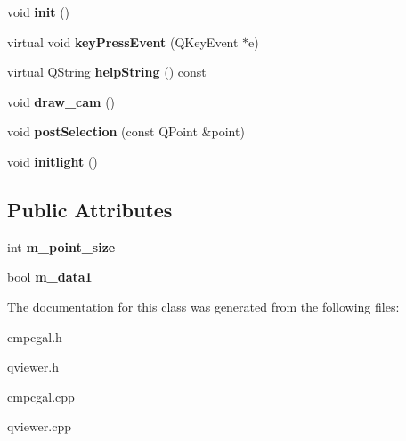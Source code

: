 \begin{DoxyCompactItemize}
\item 
\hypertarget{class_viewer_a255cc2d6f55fc8565e614618d41589b1}{
void {\bfseries init} ()}
\label{class_viewer_a255cc2d6f55fc8565e614618d41589b1}

\item 
\hypertarget{class_viewer_a9bc49dc312b1f604d443fbb8f724e104}{
virtual void {\bfseries keyPressEvent} (QKeyEvent $\ast$e)}
\label{class_viewer_a9bc49dc312b1f604d443fbb8f724e104}

\item 
\hypertarget{class_viewer_a5fef89556122c0438ea653a59e8bceaf}{
virtual QString {\bfseries helpString} () const }
\label{class_viewer_a5fef89556122c0438ea653a59e8bceaf}

\item 
\hypertarget{class_viewer_a3bc77e764106841b3c1f323cfcc01471}{
void {\bfseries draw\_\-cam} ()}
\label{class_viewer_a3bc77e764106841b3c1f323cfcc01471}

\item 
\hypertarget{class_viewer_aed885858645c43559de13e29ec0735a5}{
void {\bfseries postSelection} (const QPoint \&point)}
\label{class_viewer_aed885858645c43559de13e29ec0735a5}

\item 
\hypertarget{class_viewer_a6a4fe3649b595b303508abeb81a2ac08}{
void {\bfseries initlight} ()}
\label{class_viewer_a6a4fe3649b595b303508abeb81a2ac08}

\end{DoxyCompactItemize}
\subsection*{Public Attributes}
\begin{DoxyCompactItemize}
\item 
\hypertarget{class_viewer_a3441057d12edf3fe18979e01e90dbc8a}{
int {\bfseries m\_\-point\_\-size}}
\label{class_viewer_a3441057d12edf3fe18979e01e90dbc8a}

\item 
\hypertarget{class_viewer_a9cc31325b22c3119c4573bbfe8e5070f}{
bool {\bfseries m\_\-data1}}
\label{class_viewer_a9cc31325b22c3119c4573bbfe8e5070f}

\end{DoxyCompactItemize}


The documentation for this class was generated from the following files:\begin{DoxyCompactItemize}
\item 
cmpcgal.h\item 
qviewer.h\item 
cmpcgal.cpp\item 
qviewer.cpp\end{DoxyCompactItemize}
